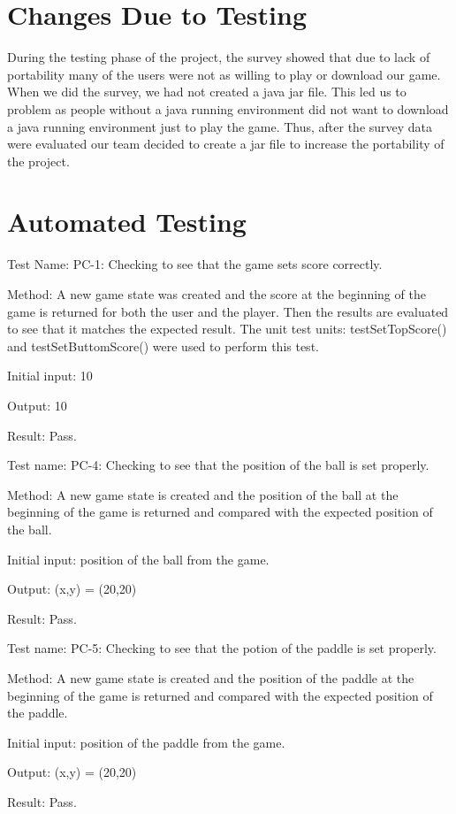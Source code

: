 \documentclass{article}
\begin{document}
\section{Changes Due to Testing}
During the testing phase of the project, the survey showed that due to lack of portability many of the users were not as willing to play or download our game. When we did the survey, we had not created a java jar file. This led us to problem as people without a java running environment did not want to download a java running environment just to play the game. Thus, after the survey data were evaluated our team decided to create a jar file to increase the portability of the project.

\section{Automated Testing}
Test Name: PC-1: Checking to see that the game sets score correctly. \par
Method: A new game state was created and the score at the beginning of the game is returned for both the user and the player. Then the results are evaluated to see that it matches the expected result. The unit test units: testSetTopScore() and testSetButtomScore() were used to perform this test. \par
Initial input: 10 \par
Output: 10 \par
Result: Pass. \par

\vspace{5mm}


Test name: PC-4: Checking to see that the position of the ball is set properly. \par
Method: A new game state is created and the position of the ball at the beginning of the game is returned and compared with the expected position of the ball. \par
Initial input: position of the ball from the game. \par
Output: (x,y) = (20,20) \par
Result: Pass. \par

\vspace{5mm}


Test name: PC-5: Checking to see that the potion of the paddle is set properly. \par
Method: A new game state is created and the position of the paddle at the beginning of the game is returned and compared with the expected position of the paddle. \par
Initial input: position of the paddle from the game. \par
Output: (x,y) = (20,20) \par
Result: Pass. \par
\end{document}
